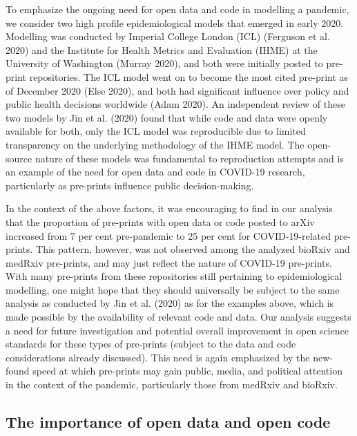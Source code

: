 \documentclass[
]{article}
\begin{document}
To emphasize the ongoing need for open data and code in modelling a pandemic, we consider two high profile epidemiological models that emerged in early 2020. Modelling was conducted by Imperial College London (ICL) (Ferguson et al. 2020) and the Institute for Health Metrics and Evaluation (IHME) at the University of Washington (Murray 2020), and both were initially posted to pre-print repositories. The ICL model went on to become the most cited pre-print as of December 2020 (Else 2020), and both had significant influence over policy and public health decisions worldwide (Adam 2020). An independent review of these two models by Jin et al. (2020) found that while code and data were openly available for both, only the ICL model was reproducible due to limited transparency on the underlying methodology of the IHME model. The open-source nature of these models was fundamental to reproduction attempts and is an example of the need for open data and code in COVID-19 research, particularly as pre-prints influence public decision-making.

In the context of the above factors, it was encouraging to find in our analysis that the proportion of pre-prints with open data or code posted to arXiv increased from 7 per cent pre-pandemic to 25 per cent for COVID-19-related pre-prints. This pattern, however, was not observed among the analyzed bioRxiv and medRxiv pre-prints, and may just reflect the nature of COVID-19 pre-prints. With many pre-prints from these repositories still pertaining to epidemiological modelling, one might hope that they should universally be subject to the same analysis as conducted by Jin et al. (2020) as for the examples above, which is made possible by the availability of relevant code and data. Our analysis suggests a need for future investigation and potential overall improvement in open science standards for these types of pre-prints (subject to the data and code considerations already discussed). This need is again emphasized by the new-found speed at which pre-prints may gain public, media, and political attention in the context of the pandemic, particularly those from medRxiv and bioRxiv.

\hypertarget{the-importance-of-open-data-and-open-code}{%
\subsection{The importance of open data and open code}\label{the-importance-of-open-data-and-open-code}}
\end{document}
